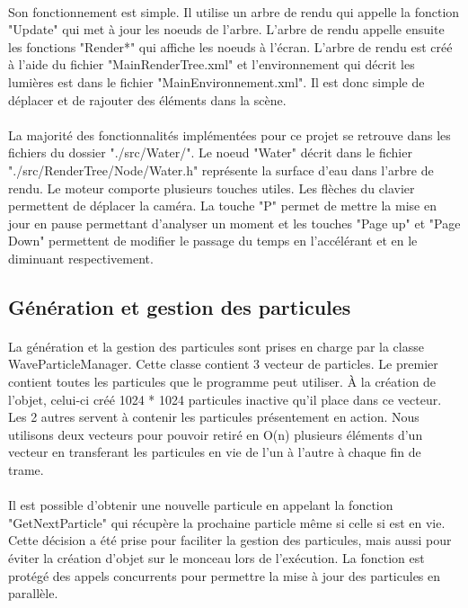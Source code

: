 \documentclass[a4paper, 12pt]{article} %
\begin{document}
	\paragraph{}
	Son fonctionnement est simple. Il utilise un arbre de rendu qui appelle la fonction "Update" qui met à jour les noeuds de l'arbre.
	L'arbre de rendu appelle ensuite les fonctions "Render*" qui affiche les noeuds à l'écran. L'arbre de rendu est créé à l'aide du
	fichier "MainRenderTree.xml" et l'environnement qui décrit les lumières est dans le fichier "MainEnvironnement.xml". Il est donc
	simple de déplacer et de rajouter des éléments dans la scène.

	\paragraph{}
	La majorité des fonctionnalités implémentées pour ce projet se retrouve dans les fichiers du dossier "./src/Water/". Le noeud 
	"Water" décrit dans le fichier "./src/RenderTree/Node/Water.h" représente la surface d'eau dans l'arbre de rendu.
	Le moteur comporte plusieurs touches utiles. Les flèches du clavier permettent de déplacer la caméra. La touche "P" permet de mettre la mise en jour
	en pause permettant d'analyser un moment et les touches "Page up" et "Page Down" permettent de modifier le passage du temps en l'accélérant et en 
	le diminuant respectivement.

\subsection{Génération et gestion des particules}
	\paragraph{}
	La génération et la gestion des particules sont prises en charge par la classe WaveParticleManager. Cette classe contient 3 vecteur de particles.
	Le premier contient toutes les particules que le programme peut utiliser. À la création de l'objet, celui-ci créé 1024 * 1024 particules inactive 
	qu'il place dans ce vecteur. Les 2 autres servent à contenir les particules présentement en action. Nous utilisons deux vecteurs pour pouvoir 
	retiré en O(n) plusieurs éléments d'un vecteur en transferant les particules en vie de l'un à l'autre à chaque fin de trame. 
    
	\paragraph{}
	Il est possible d'obtenir une nouvelle particule en appelant la fonction "GetNextParticle" qui récupère la prochaine particle même si celle si est en vie.
	Cette décision a été prise pour faciliter la gestion des particules, mais aussi pour éviter la création d'objet sur le monceau lors de l'exécution. La 
	fonction est protégé des appels concurrents pour permettre la mise à jour des particules en parallèle.
\end{document}
